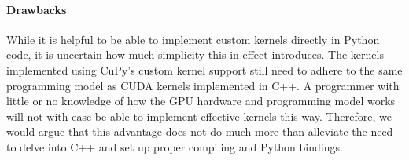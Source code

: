 \paragraph{Drawbacks}
While it is helpful to be able to implement custom kernels directly in Python code, it is uncertain how much simplicity this in effect introduces.
The kernels implemented using CuPy's custom kernel support still need to adhere to the same programming model as CUDA kernels implemented in C++.
A programmer with little or no knowledge of how the GPU hardware and programming model works will not with ease be able to implement effective kernels this way.
Therefore, we would argue that this advantage does not do much more than alleviate the need to delve into C++ and set up proper compiling and Python bindings.
